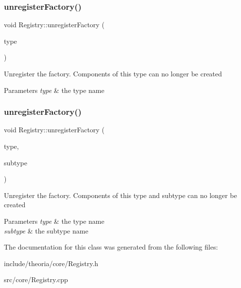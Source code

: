 \subsubsection{\texorpdfstring{unregister\+Factory()}{unregisterFactory()}\hspace{0.1cm}{\footnotesize\ttfamily [1/2]}}
{\footnotesize\ttfamily void Registry\+::unregister\+Factory (\begin{DoxyParamCaption}\item[{const Type\+Name \&}]{type }\end{DoxyParamCaption})}

Unregister the factory. Components of this type can no longer be created 
\begin{DoxyParams}{Parameters}
{\em type} & the type name \\
\hline
\end{DoxyParams}
\mbox{\label{classtheoria_1_1core_1_1Registry_aabfbd64902458b12cfd7bd20cf400837}} 
\subsubsection{\texorpdfstring{unregister\+Factory()}{unregisterFactory()}\hspace{0.1cm}{\footnotesize\ttfamily [2/2]}}
{\footnotesize\ttfamily void Registry\+::unregister\+Factory (\begin{DoxyParamCaption}\item[{const Type\+Name \&}]{type,  }\item[{const Sub\+Type\+Name \&}]{subtype }\end{DoxyParamCaption})}

Unregister the factory. Components of this type and subtype can no longer be created 
\begin{DoxyParams}{Parameters}
{\em type} & the type name \\
\hline
{\em subtype} & the subtype name \\
\hline
\end{DoxyParams}


The documentation for this class was generated from the following files\+:\begin{DoxyCompactItemize}
\item 
include/theoria/core/Registry.\+h\item 
src/core/Registry.\+cpp\end{DoxyCompactItemize}
